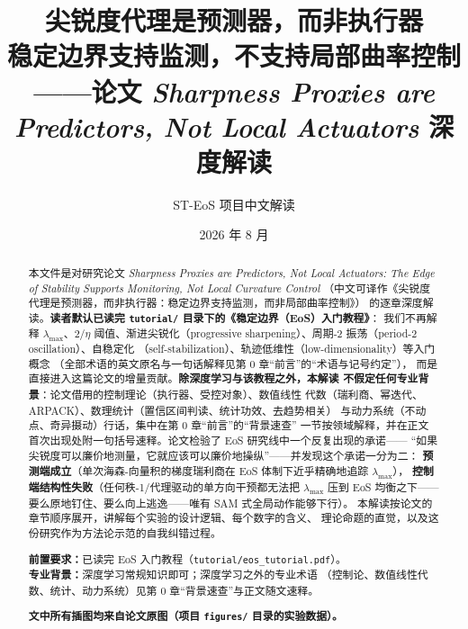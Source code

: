 \documentclass[11pt,a4paper]{ctexart}
\title{\textbf{\Huge 尖锐度代理是预测器，而非执行器\\[0.4em]
\Large 稳定边界支持监测，不支持局部曲率控制\\[0.8em]
\normalsize ——论文 \textit{Sharpness Proxies are Predictors, Not Local Actuators} 深度解读}}
\author{ST-EoS 项目中文解读}
\date{2026 年 8 月}
\newcommand{\lmax}{\ensuremath{\lambda_{\max}}}
\theoremstyle{definition}
\theoremstyle{remark}
\begin{document}
\maketitle
\thispagestyle{empty}

\begin{abstract}
\noindent
本文件是对研究论文 \textit{Sharpness Proxies are Predictors, Not Local Actuators:
The Edge of Stability Supports Monitoring, Not Local Curvature Control}
（中文可译作《尖锐度代理是预测器，而非执行器：稳定边界支持监测，而非局部曲率控制》）
的逐章深度解读。\textbf{读者默认已读完 \texttt{tutorial/} 目录下的《稳定边界（EoS）入门教程》}：
我们不再解释 $\lmax$、$2/\eta$ 阈值、渐进尖锐化（progressive
sharpening）、周期-2 振荡（period-2 oscillation）、自稳定化
（self-stabilization）、轨迹低维性（low-dimensionality）等入门概念
（全部术语的英文原名与一句话解释见第 0 章``前言''的``术语与记号约定''），
而是直接进入这篇论文的增量贡献。\textbf{除深度学习与该教程之外，本解读
不假定任何专业背景}：论文借用的控制理论（执行器、受控对象）、数值线性
代数（瑞利商、幂迭代、ARPACK）、数理统计（置信区间判读、统计功效、去趋势相关）
与动力系统（不动点、奇异摄动）行话，集中在第 0 章``前言''的``背景速查''
一节按领域解释，并在正文首次出现处附一句括号速释。论文检验了 EoS
研究线中一个反复出现的承诺——
``如果尖锐度可以廉价地测量，它就应该可以廉价地操纵''——并发现这个承诺一分为二：
\textbf{预测端成立}（单次海森-向量积的梯度瑞利商在 EoS 体制下近乎精确地追踪 $\lmax$），
\textbf{控制端结构性失败}（任何秩-1/代理驱动的单方向干预都无法把 $\lmax$ 压到
EoS 均衡之下——要么原地钉住、要么向上逃逸——唯有 SAM 式全局动作能够下行）。
本解读按论文的章节顺序展开，讲解每个实验的设计逻辑、每个数字的含义、
理论命题的直觉，以及这份研究作为方法论示范的自我纠错过程。

\vspace{0.8em}
\noindent\textbf{前置要求：}已读完 EoS 入门教程（\texttt{tutorial/eos\_tutorial.pdf}）。\\[0.3em]
\noindent\textbf{专业背景：}深度学习常规知识即可；深度学习之外的专业术语
（控制论、数值线性代数、统计、动力系统）见第 0 章``背景速查''与正文随文速释。

\vspace{0.5em}
\noindent\textbf{文中所有插图均来自论文原图（项目 \texttt{figures/} 目录的实验数据）。}
\end{abstract}

\newpage
\tableofcontents
\newpage

\setcounter{section}{-1}













\end{document}
